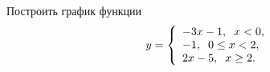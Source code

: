 \begin{ex}
	\begin{condition}
		Построить график функции
		\[ y = 
		\left\{
		\begin{array}{l}
			-3x-1,\hspace{2mm}x<0, \\
			-1,\hspace{2mm}0\le x < 2, \\
			2x-5,\hspace{2mm} x \ge  2.
		\end{array}
		\right.
		\]
	\end{condition}
\end{ex}